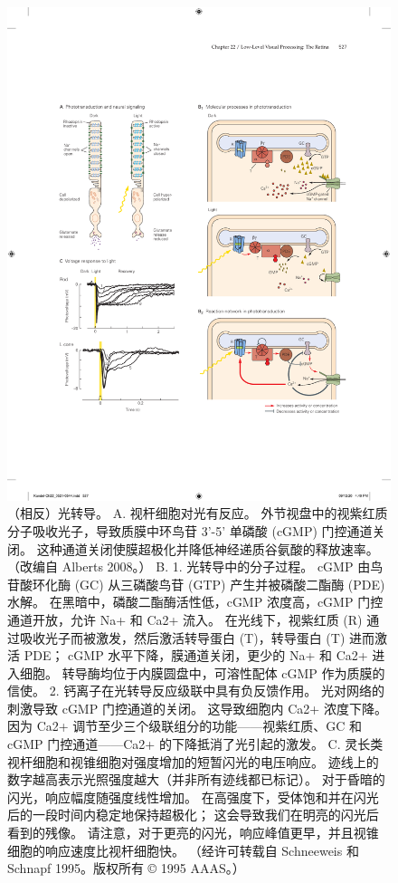 \begin{figure}[htbp]
	\centering
	\includegraphics[width=1.0\linewidth]{chap22/fig_22_7}
	\caption{（相反）光转导。 
		A. 视杆细胞对光有反应。 
		外节视盘中的视紫红质分子吸收光子，导致质膜中环鸟苷 3'-5' 单磷酸 (cGMP) 门控通道关闭。 
		这种通道关闭使膜超极化并降低神经递质谷氨酸的释放速率。 （改编自 Alberts 2008。） 
		B. 1. 光转导中的分子过程。 cGMP 由鸟苷酸环化酶 (GC) 从三磷酸鸟苷 (GTP) 产生并被磷酸二酯酶 (PDE) 水解。 
		在黑暗中，磷酸二酯酶活性低，cGMP 浓度高，cGMP 门控通道开放，允许 Na+ 和 Ca2+ 流入。 在光线下，视紫红质 (R) 通过吸收光子而被激发，然后激活转导蛋白 (T)，转导蛋白 (T) 进而激活 PDE； cGMP 水平下降，膜通道关闭，更少的 Na+ 和 Ca2+ 进入细胞。 转导酶均位于内膜圆盘中，可溶性配体 cGMP 作为质膜的信使。 
		2. 钙离子在光转导反应级联中具有负反馈作用。 光对网络的刺激导致 cGMP 门控通道的关闭。 这导致细胞内 Ca2+ 浓度下降。 因为 Ca2+ 调节至少三个级联组分的功能——视紫红质、GC 和 cGMP 门控通道——Ca2+ 的下降抵消了光引起的激发。 
		C. 灵长类视杆细胞和视锥细胞对强度增加的短暂闪光的电压响应。 
		迹线上的数字越高表示光照强度越大（并非所有迹线都已标记）。 
		对于昏暗的闪光，响应幅度随强度线性增加。 
		在高强度下，受体饱和并在闪光后的一段时间内稳定地保持超极化； 
		这会导致我们在明亮的闪光后看到的残像。 
		请注意，对于更亮的闪光，响应峰值更早，并且视锥细胞的响应速度比视杆细胞快。 （经许可转载自 Schneeweis 和 Schnapf 1995。版权所有 © 1995 AAAS。）}
	\label{fig:22_7}
\end{figure}

